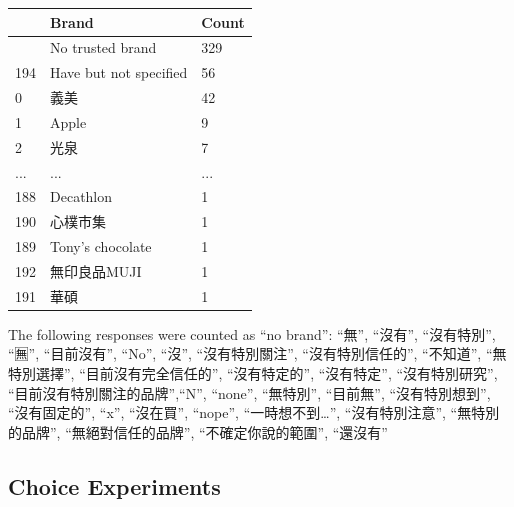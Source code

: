 \documentclass[
  letterpaper,
  DIV=11,
  numbers=noendperiod]{scrartcl}
\begin{document}
\begin{longtable}[]{@{}lll@{}}
\toprule\noalign{}
& Brand & Count \\
\midrule\noalign{}
\endhead
\bottomrule\noalign{}
\endlastfoot
193 & No trusted brand & 329 \\
194 & Have but not specified & 56 \\
0 & 義美 & 42 \\
1 & Apple & 9 \\
2 & 光泉 & 7 \\
... & ... & ... \\
188 & Decathlon & 1 \\
190 & 心樸市集 & 1 \\
189 & Tony's chocolate & 1 \\
192 & 無印良品MUJI & 1 \\
191 & 華碩 & 1 \\
\end{longtable}

The following responses were counted as ``no brand'': ``無'', ``沒有'',
``沒有特別'', ``🈚️'', ``目前沒有'', ``No'', ``沒'', ``沒有特別關注'',
``沒有特別信任的'', ``不知道'', ``無特別選擇'', ``目前沒有完全信任的'',
``沒有特定的'', ``沒有特定'', ``沒有特別研究'',
``目前沒有特別關注的品牌'',``N'', ``none'', ``無特別'', ``目前無'',
``沒有特別想到'', ``沒有固定的'', ``x'', ``沒在買'', ``nope'',
``一時想不到\ldots{}'', ``沒有特別注意'', ``無特別的品牌'',
``無絕對信任的品牌'', ``不確定你說的範圍'', ``還沒有''

\subsection{Choice Experiments}\label{choice-experiments}
\end{document}
